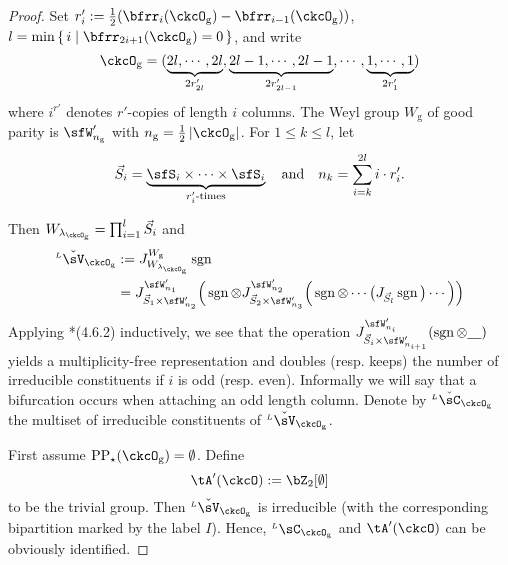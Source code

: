 \documentclass[12pt,a4paper]{amsart}
\def\abs#1{\left|{#1}\right|}
\newcommand{\sgn}{\operatorname{sgn}}
\numberwithin{equation}{section}
\theoremstyle{remark}
\def\half{{\tfrac{1}{2}}}
\def\lamckg{\lambda_{\ckcO_{\mathrm g}}}
\def\LC{{}^{\scriptscriptstyle L}\sC}
\def\ckLC{{}^{\scriptscriptstyle L}\check{\sC}}
\def\ckLV{{}^{\scriptscriptstyle L}\check\sV}
\def\ckLC{{}^{\scriptscriptstyle L}\check\sC}
\def\Wg{W_{\mathrm g}}
\def\AND{\quad \text{and} \quad}
\def\CPPs{\mathrm{PP}_{\star}}
\begin{document}
\begin{proof}
{    Set $r'_{i} := \half(\bfrr_{i}(\ckcO_{\mathrm g})-\bfrr_{i-1}(\ckcO_{\mathrm g}))$,
    $l =\min\set{i|\bfrr_{2i+1}(\ckcO_{\mathrm g})=0}$, and write
    \[
      \ckcO_{\mathrm g} %
      = (\underbrace{2l,\cdots, 2l}_{2r'_{2l}}, \underbrace{2l-1,\cdots, 2l-1}_{2r'_{2l-1}},\cdots,
      \underbrace{1,\cdots, 1}_{2r'_{1}})
    \]
    where $i^{r'}$ denotes $r'$-copies of length $i$ columns.
    The Weyl group $W_{\mathrm g}$ of good parity is $\sfW'_{n_{\mathrm g}}$ with
    $n_{\mathrm g} = \half\abs{\ckcO_{\mathrm g}}$. For $1\leq k\leq l$, let
    \[
      \vec{S}_{i} = \underbrace{\sfS_{i}\times \cdots\times \sfS_{i}}_{r'_{i}\text{-times}} \AND n_{k} = \sum_{i=k}^{2l} i\cdot r'_{i}.
    \]

    Then $W_{\lamckg}=\prod_{i=1}^{l} \vec{S}_{i}$ and
    \[
      \begin{split}
        \ckLV_{\ckcO_{\mathrm g}}& :=J_{W_{\lamckg}}^{\Wg}\sgn\\
        & = J_{\vec{S}_{1}\times \sfW'_{n_{2}}}^{\sfW'_{n_{1}}} \Big(\sgn \otimes J_{\vec{S}_{2}\times \sfW'_{n_{3}}}^{\sfW'_{n_{2}}}\Big(\sgn
        \otimes \cdots\big(J_{\vec{S}_{l}} \sgn\big)\cdots \Big)\Big) \\
      \end{split}
    \]
    Applying \cite{Lu}*{(4.6.2)} inductively, we see that the operation
    $J_{\vec{S}_{i}\times \sfW'_{n_{i+1}}}^{\sfW'_{n_{i}}}(\sgn \otimes \underline{\ \ \ })$ yields a multiplicity-free representation and
    doubles (resp. keeps) the number of irreducible constituents if $i$ is odd (resp. even). Informally we will say that a bifurcation occurs when attaching an odd length column.
    Denote by $\ckLC_{\ckcO_{\mathrm g}}$ the multiset of irreducible constituents of $\ckLV_{\ckcO_{\mathrm g}}$.

    First assume $\CPPs(\ckcO_{\mathrm g}) = \emptyset$. Define
    \[
      \tA'(\ckcO):= \bZ_{2}[\emptyset]
    \]
    to be the trivial group.
    Then $\ckLV_{\ckcO_{\mathrm g}}$ is
    irreducible (with the corresponding bipartition marked by the label $I$).  Hence, $\LC_{\ckcO_{\mathrm g}}$
    and $\tA'(\ckcO)$ can be obviously identified.


}
\end{proof}
\end{document}
